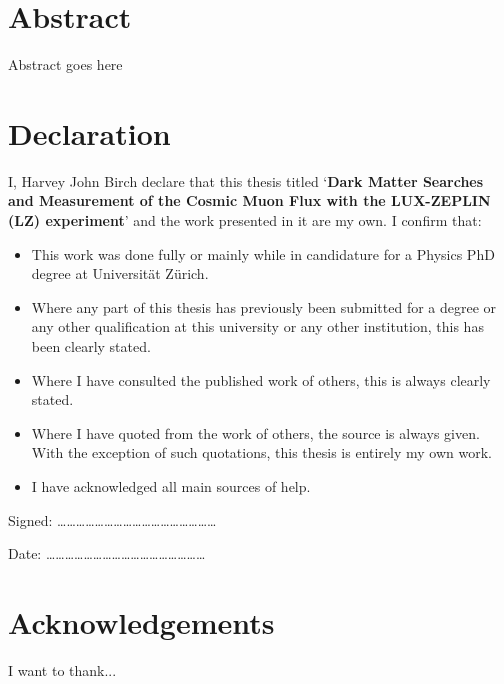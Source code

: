 \documentclass[a4paper,11pt,usegeometry]{scrreprt} %
\begin{document}
\chapter*{Abstract}
Abstract goes here


\newpage\null\thispagestyle{empty}\newpage

\chapter*{Declaration}
\vskip 1in
I, Harvey John Birch declare that this thesis titled ‘\textbf{Dark Matter Searches and Measurement of the Cosmic Muon Flux with the LUX-ZEPLIN (LZ) experiment}’ and the work presented in it are my own. I confirm that:
\bigbreak

\begin{itemize}
\item This work was done fully or mainly while in candidature for a Physics PhD degree at Universit\"at Z\"urich.
\item Where any part of this thesis has previously been submitted for a degree or any other qualification at this university or any other institution, this has been clearly stated.
\item Where I have consulted the published work of others, this is always clearly stated.
\item Where I have quoted from the work of others, the source is always given. With the exception of such quotations, this thesis is entirely my own work.
\item I have acknowledged all main sources of help.
\end{itemize}
\vskip 2in

Signed:
……………………………………………
\bigskip

Date:
……………………………………………

\newpage\null\thispagestyle{empty}\newpage

\chapter*{Acknowledgements}
I want to thank...

\tableofcontents
\listoffigures	%
\listoftables  %
\clearpage
{}








\printbibliography[heading=bibintoc,title={Bibliography}]
\end{document}
